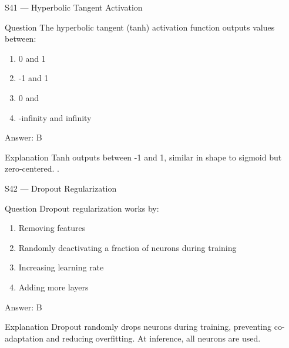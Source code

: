 \documentclass[aspectratio=169,8pt]{beamer}
\begin{document}
	\begin{frame}{S41 --- Hyperbolic Tangent Activation}
		\begin{block}{Question}
			The hyperbolic tangent (tanh) activation function outputs values between:
			\begin{enumerate}
				\item 0 and 1
				\item -1 and 1
				\item 0 and 
				\item -infinity and infinity
			\end{enumerate}
		\end{block}
		\begin{exampleblock}{Answer: B}\end{exampleblock}
		\begin{block}{Explanation}
			Tanh outputs between -1 and 1, similar in shape to sigmoid but zero-centered. .
		\end{block}
	\end{frame}
	
	\begin{frame}{S42 --- Dropout Regularization}
		\begin{block}{Question}
			Dropout regularization works by:
			\begin{enumerate}
				\item Removing features
				\item Randomly deactivating a fraction of neurons during training
				\item Increasing learning rate
				\item Adding more layers
			\end{enumerate}
		\end{block}
		\begin{exampleblock}{Answer: B}\end{exampleblock}
		\begin{block}{Explanation}
			Dropout randomly drops neurons during training, preventing co-adaptation and reducing overfitting. At inference, all neurons are used.
		\end{block}
	\end{frame}
	
\end{document}
